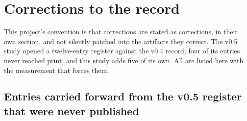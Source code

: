 \section{Corrections to the record}
\label{sec:corrections}

This project's convention is that corrections are stated as corrections, in their own section, and
not silently patched into the artifacts they correct. The v0.5 study opened a twelve-entry register
against the v0.4 record; four of its entries never reached print, and this study adds five of its
own. All are listed here with the measurement that forces them.

\subsection{Entries carried forward from the v0.5 register that were never published}
\label{sec:corr-vfour}
\label{sec:corr-dialect}

